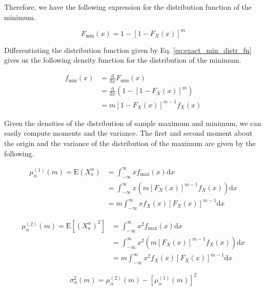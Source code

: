 \documentclass[10pt,letterpaper]{article}\usepackage[]{graphicx}\usepackage[]{color}
\begin{document}
Therefore, we have the following expression for the distribution function of the minimum.

\begin{equation}\label{eq:exact_min_distr_fn}
F_\text{min}(x) = 1 - [1 - F_X(x)]^m
\end{equation}

Differentiating the distribution function given by Eq. \ref{eq:exact_min_distr_fn} gives us the following density function for the distribution of the minimum.

\begin{equation}\label{eq:exact_min_dens_fn}
\begin{aligned}
f_\text{min}(x) &= \frac{\text{d}}{\text{d}x} F_\text{min}(x) \\
&= \frac{\text{d}}{\text{d}x} \left(1 - [1 - F_X(x)]^m\right) \\
&= m\left[1 - F_X(x)\right]^{m-1}f_X(x)
\end{aligned}
\end{equation}

Given the densities of the distribution of sample maximum and minimum, we can easily compute moments and the variance. The first and second moment about the origin and the variance of the distribution of the maximum are given by the following.

\begin{equation}\label{eq:mu_max}
\begin{aligned}
\mu^{(1)}_\alpha(m) = \text{E}(X^\alpha_a) &= \int_{-\infty}^{\infty}x f_\text{max}(x)\text{d}x \\
&= \int_{-\infty}^{\infty}x \left(m [F_X(x)]^{m-1} f_X(x)\right)\text{d}x \\
&= m \int_{-\infty}^{\infty}x f_X(x) [F_X(x)]^{m-1}\text{d}x
\end{aligned}
\end{equation}

\begin{equation}\label{eq:mu2_max}
\begin{aligned}
\mu^{(2)}_\alpha(m) = \text{E}[(X^\alpha_a)^2] &= \int_{-\infty}^{\infty}x^2 f_\text{max}(x)\text{d}x \\
&= \int_{-\infty}^{\infty}x^2 \left(m [F_X(x)]^{m-1} f_X(x)\right)\text{d}x \\
&= m \int_{-\infty}^{\infty}x^2 f_X(x) [F_X(x)]^{m-1}\text{d}x
\end{aligned}
\end{equation}

\begin{equation}\label{eq:sig_max}
\sigma^2_\alpha(m) = \mu^{(2)}_\alpha(m) - \left[\mu^{(1)}_\alpha(m)\right]^2
\end{equation}
\end{document}

